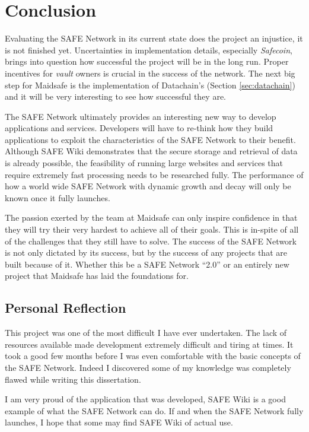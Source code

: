 \chapter{Conclusion}

Evaluating the SAFE Network in its current state does the project an injustice, it is not finished yet. Uncertainties in implementation details, especially \textit{Safecoin}, brings into question how successful the project will be in the long run. Proper incentives for \textit{vault} owners is crucial in the success of the network. The next big step for Maidsafe is the implementation of Datachain's (Section \ref{sec:datachain}) and it will be very interesting to see how successful they are.

The SAFE Network ultimately provides an interesting new way to develop applications and services. Developers will have to re-think how they build applications to exploit the characteristics of the SAFE Network to their benefit. Although SAFE Wiki demonstrates that the secure storage and retrieval of data is already possible, the feasibility of running large websites and services that require extremely fast processing needs to be researched fully. The performance of how a world wide SAFE Network with dynamic growth and decay will only be known once it fully launches.

The passion exerted by the team at Maidsafe can only inspire confidence in that they will try their very hardest to achieve all of their goals. This is in-spite of all of the challenges that they still have to solve. The success of the SAFE Network is not only dictated by its success, but by the success of any projects that are built because of it. Whether this be a SAFE Network ``2.0'' or an entirely new project that Maidsafe has laid the foundations for.

\section{Personal Reflection}

This project was one of the most difficult I have ever undertaken. The lack of resources available made development extremely difficult and tiring at times. It took a good few months before I was even comfortable with the basic concepts of the SAFE Network. Indeed I discovered some of my knowledge was completely flawed while writing this dissertation.

I am very proud of the application that was developed, SAFE Wiki is a good example of what the SAFE Network can do. If and when the SAFE Network fully launches, I hope that some may find SAFE Wiki of actual use.

